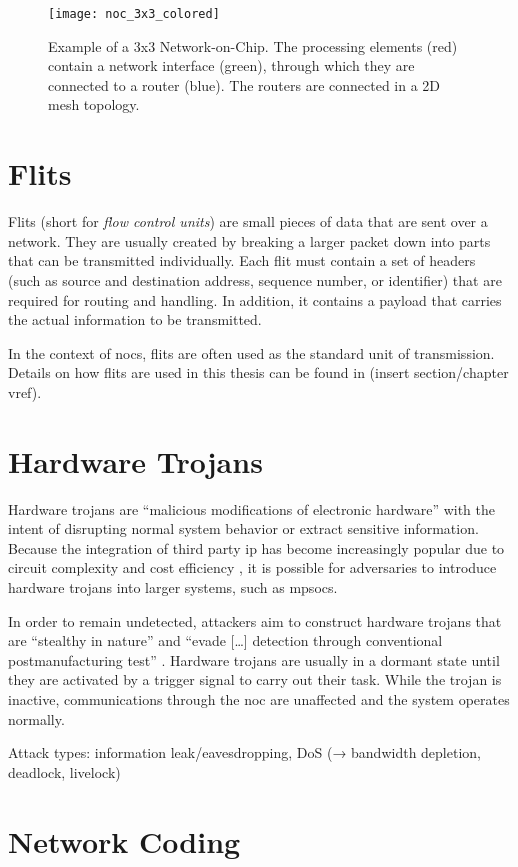 \begin{figure}
    \centering
    \texttt{[image: noc\_3x3\_colored]}
    \caption[Example of a 3x3 NoC]{Example of a 3x3 Network-on-Chip. The processing elements (red) contain a network interface
    (green), through which they are connected to a router (blue). The routers are connected in a 2D mesh topology.}
    \label{fig:nocexample}
\end{figure}

\section{Flits}\label{sec:flits}
Flits (short for \textit{flow control units}) are small pieces of data that are sent over a network. They are usually created by breaking a larger
packet down into parts that can be transmitted individually. \cite[6]{flitslecturecmu} Each flit must contain a set of headers (such as source and
destination address, sequence number, or identifier) that are required for routing and handling. \cite[2]{flitslectureutah} In addition, it contains
a payload that carries the actual information to be transmitted.

In the context of \glspl{noc}, flits are often used as the standard unit of transmission. \cite[51\psqq]{tatas16designingnocs} Details on how flits
are used in this thesis can be found in (insert section/chapter vref).

\section{Hardware Trojans}\label{sec:hardwaretrojans}
Hardware trojans are \enquote{malicious modifications of electronic hardware} \cite[1]{bhunia14hardwaretrojans} with the intent of disrupting normal
system behavior or extract sensitive information. Because the integration of third party \gls{ip} has become increasingly popular due to circuit
complexity and cost efficiency \cites[1]{ancajas14fortnocs}[2]{bhunia14hardwaretrojans}, it is possible for adversaries to introduce hardware
trojans into larger systems, such as \glspl{mpsoc}.

In order to remain undetected, attackers aim to construct hardware trojans that are \enquote{stealthy in nature} \cite[1]{bhunia14hardwaretrojans}
and \enquote{evade […] detection through conventional postmanufacturing test} \cite[1]{bhunia14hardwaretrojans}. Hardware trojans are usually in a
dormant state until they are activated by a trigger signal to carry out their task. \cites{bhunia14hardwaretrojans}{ancajas14fortnocs} While the
trojan is inactive, communications through the \gls{noc} are unaffected and the system operates normally.

Attack types: information leak/eavesdropping, DoS (→ bandwidth depletion, deadlock, livelock)

\section{Network Coding}\label{sec:networkcodingfun}
